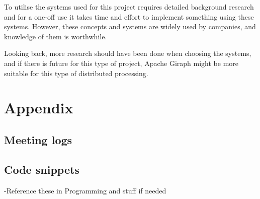 \documentclass{article}
\theoremstyle{definition}
\begin{document}
To utilise the systems used for this project requires detailed background research and for a one-off use it takes time and effort to implement something using these systems. However, these concepts and systems are widely used by companies, and knowledge of them is worthwhile. 

Looking back, more research should have been done when choosing the systems, and if there is future for this type of project, Apache Giraph might be more suitable for this type of distributed processing. 



\section{Appendix}

\subsection{Meeting logs}

\subsection{Code snippets}
-Reference these in Programming and stuff if needed 
\end{document}

